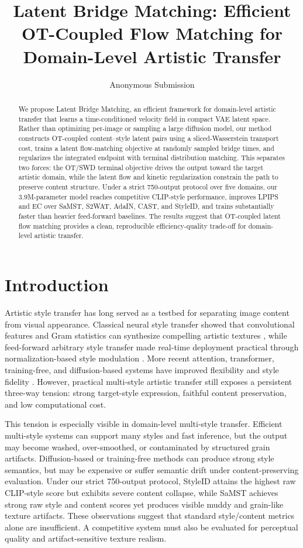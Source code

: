 ﻿\documentclass[letterpaper]{article}
\title{Latent Bridge Matching: Efficient OT-Coupled Flow Matching for Domain-Level Artistic Transfer}
\author{Anonymous Submission}
\begin{document}
\maketitle

\begin{abstract}
We propose Latent Bridge Matching, an efficient framework for domain-level artistic transfer that learns a time-conditioned velocity field in compact VAE latent space. Rather than optimizing per-image or sampling a large diffusion model, our method constructs OT-coupled content--style latent pairs using a sliced-Wasserstein transport cost, trains a latent flow-matching objective at randomly sampled bridge times, and regularizes the integrated endpoint with terminal distribution matching. This separates two forces: the OT/SWD terminal objective drives the output toward the target artistic domain, while the latent flow and kinetic regularization constrain the path to preserve content structure. Under a strict 750-output protocol over five domains, our 3.9M-parameter model reaches competitive CLIP-style performance, improves LPIPS and EC over SaMST, S2WAT, AdaIN, CAST, and StyleID, and trains substantially faster than heavier feed-forward baselines. The results suggest that OT-coupled latent flow matching provides a clean, reproducible efficiency-quality trade-off for domain-level artistic transfer.
\end{abstract}

\section{Introduction}
Artistic style transfer has long served as a testbed for separating image content from visual appearance. Classical neural style transfer showed that convolutional features and Gram statistics can synthesize compelling artistic textures \cite{gatys2016image}, while feed-forward arbitrary style transfer made real-time deployment practical through normalization-based style modulation \cite{huang2017adain}. More recent attention, transformer, training-free, and diffusion-based systems have improved flexibility and style fidelity \cite{park2019sanet,deng2022stytr2,hong2023aespa,huang2024aesfa,gim2024cast,chung2024styleid}. However, practical multi-style artistic transfer still exposes a persistent three-way tension: strong target-style expression, faithful content preservation, and low computational cost.

This tension is especially visible in domain-level multi-style transfer. Efficient multi-style systems can support many styles and fast inference, but the output may become washed, over-smoothed, or contaminated by structured grain artifacts. Diffusion-based or training-free methods can produce strong style semantics, but may be expensive or suffer semantic drift under content-preserving evaluation. Under our strict 750-output protocol, StyleID attains the highest raw CLIP-style score but exhibits severe content collapse, while SaMST achieves strong raw style and content scores yet produces visible muddy and grain-like texture artifacts. These observations suggest that standard style/content metrics alone are insufficient. A competitive system must also be evaluated for perceptual quality and artifact-sensitive texture realism.
\end{document}
